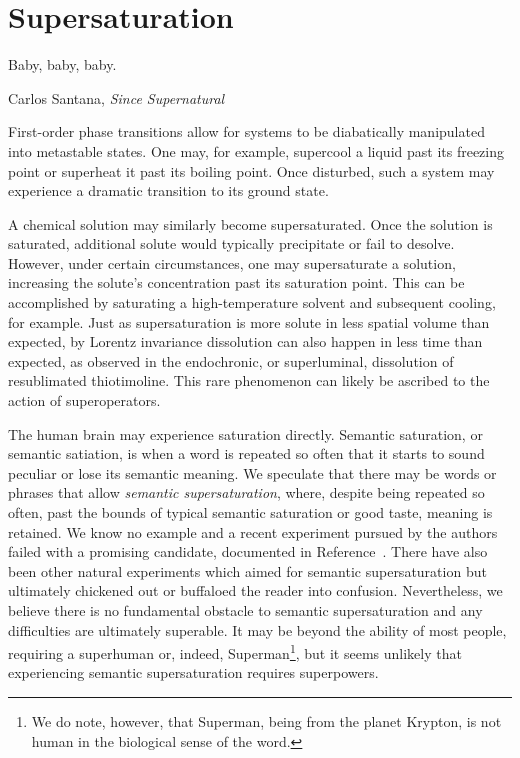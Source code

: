 \section{Supersaturation}

\epigraph{Baby, baby, baby.
}{Carlos Santana, \textit{Since Supernatural}}

First-order phase transitions allow for systems to be diabatically manipulated into metastable states.
One may, for example, supercool a liquid past its freezing point or superheat it past its boiling point.
Once disturbed, such a system may experience a dramatic transition to its ground state.

A chemical solution may similarly become supersaturated.
Once the solution is saturated, additional solute would typically precipitate or fail to desolve.
However, under certain circumstances, one may supersaturate a solution, increasing the solute's concentration past its saturation point.
This can be accomplished by saturating a high-temperature solvent and subsequent cooling, for example.
Just as supersaturation is more solute in less spatial volume than expected, by Lorentz invariance dissolution can also happen in less time than expected, as observed in the endochronic, or superluminal, dissolution of resublimated thiotimoline\cite{asimov:1948,asimov:1953,asimov:1960,vernon:2022}.
This rare phenomenon can likely be ascribed to the action of superoperators\cite{Deutsch:1991nm}.

The human brain may experience saturation directly.
Semantic saturation, or semantic satiation, is when a word is repeated so often that it starts to sound peculiar or lose its semantic meaning.
We speculate that there may be words or phrases that allow \emph{semantic supersaturation}, where, despite being repeated so often, past the bounds of typical semantic saturation or good taste, meaning is retained.
We know no example and a recent experiment pursued by the authors failed with a promising candidate, documented in Reference~\cite{self}.
There have also been other natural experiments which aimed for semantic supersaturation but ultimately chickened out\cite{chicken} or buffaloed the reader into confusion\cite{buffalo}.
Nevertheless, we believe there is no fundamental obstacle to semantic supersaturation and any difficulties are ultimately superable.
It may be beyond the ability of most people, requiring a superhuman or, indeed, Superman\footnote{We do note, however, that Superman, being from the planet Krypton, is not human in the biological sense of the word.}\cite{tippett:2009}, but it seems unlikely that experiencing semantic supersaturation requires superpowers.
